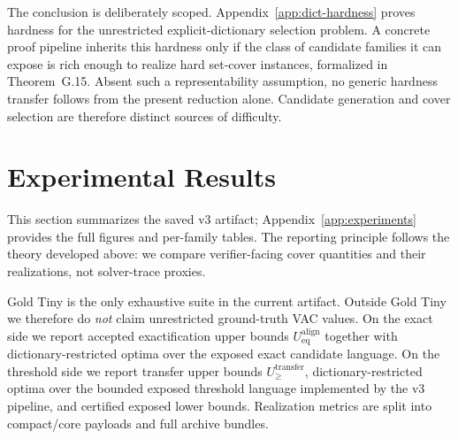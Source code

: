 \documentclass{article}
\begin{document}
The conclusion is deliberately scoped. Appendix~\ref{app:dict-hardness} proves hardness for the unrestricted explicit-dictionary selection problem. A concrete proof pipeline inherits this hardness only if the class of candidate families it can expose is rich enough to realize hard set-cover instances, formalized in Theorem~G.15. Absent such a representability assumption, no generic hardness transfer follows from the present reduction alone. Candidate generation and cover selection are therefore distinct sources of difficulty.

\section{Experimental Results}\label{sec:results}

This section summarizes the saved v3 artifact; Appendix~\ref{app:experiments} provides the full figures and per-family tables. The reporting principle follows the theory developed above: we compare verifier-facing cover quantities and their realizations, not solver-trace proxies.

Gold Tiny is the only exhaustive suite in the current artifact. Outside Gold Tiny we therefore do \emph{not} claim unrestricted ground-truth VAC values. On the exact side we report accepted exactification upper bounds $U_{\mathrm{eq}}^{\mathrm{align}}$ together with dictionary-restricted optima over the exposed exact candidate language. On the threshold side we report transfer upper bounds $U_{\ge}^{\mathrm{transfer}}$, dictionary-restricted optima over the bounded exposed threshold language implemented by the v3 pipeline, and certified exposed lower bounds. Realization metrics are split into compact/core payloads and full archive bundles.
\end{document}
